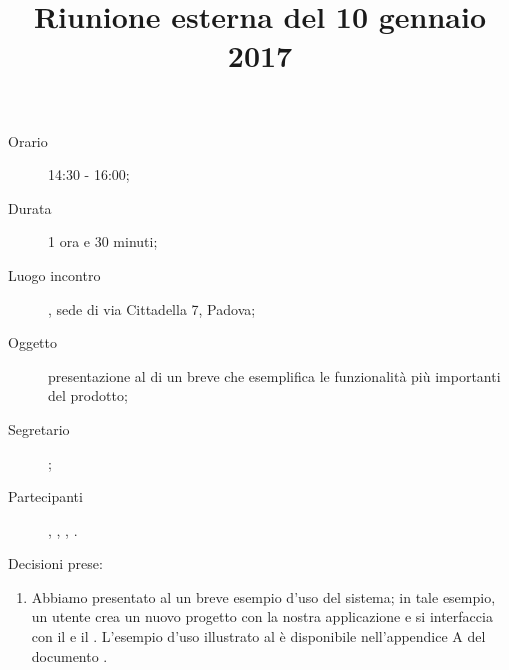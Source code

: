 


\author{\GG}
\supervisor{\MM}
\title{Riunione esterna del 10 gennaio 2017}



\maketitle

\begin{description}
	\item[Orario] 14:30 - 16:00;
	\item[Durata] 1 ora e 30 minuti;
	\item[Luogo incontro] \ZU, sede di via Cittadella 7, Padova;
	\item[Oggetto] presentazione al \GP di un breve  che esemplifica le funzionalità più importanti del prodotto;
	\item[Segretario] \MM; 
	\item[Partecipanti] \GP, \LB, \GG, \MM.
\end{description}

Decisioni prese:
\begin{enumerate}
	\item Abbiamo presentato al \GP un breve esempio d'uso del sistema; in tale esempio, un utente crea un nuovo progetto con la nostra applicazione e si interfaccia con il  e il . L'esempio d'uso illustrato al \GP è disponibile nell'appendice A del documento \AdR.
\end{enumerate}


